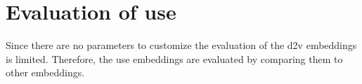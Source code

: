 \section{Evaluation of \ac{use}}\label{sec:evaluation-use}

Since there are no parameters to customize the evaluation of the \ac{d2v} embeddings is limited.
Therefore, the \ac{use} embeddings are evaluated by comparing them to other embeddings.